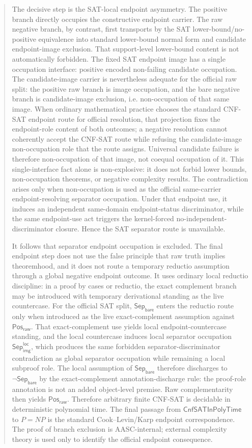 \documentclass[11pt]{article}
\theoremstyle{definition}
\theoremstyle{remark}
\newcommand{\PosRaw}{\mathsf{Pos}_{\mathsf{raw}}}
\newcommand{\SepBare}{\mathsf{Sep}_{\mathsf{bare}}}
\newcommand{\LocalSepImgOcc}{\mathsf{Sep}_{\mathsf{img}}^{\mathsf{loc}}}
\newcommand{\CnfSATP}{\mathsf{CnfSATInPolyTime}}
\begin{document}
\begin{abstract}
The decisive step is the SAT-local endpoint asymmetry. The positive branch directly occupies the constructive endpoint carrier. The raw negative branch, by contrast, first transports by the SAT lower-bound/no-positive equivalence into standard lower-bound normal form and candidate endpoint-image exclusion. That support-level lower-bound content is not automatically forbidden. The fixed SAT endpoint image has a single occupation interface: positive encoded non-failing candidate occupation. The candidate-image carrier is nevertheless adequate for the official raw split: the positive raw branch is image occupation, and the bare negative branch is candidate-image exclusion, i.e. non-occupation of that same image. When ordinary mathematical practice chooses the standard CNF-SAT endpoint route for official resolution, that projection fixes the endpoint-role content of both outcomes; a negative resolution cannot coherently accept the CNF-SAT route while refusing the candidate-image non-occupation role that the route assigns. Universal candidate failure is therefore non-occupation of that image, not coequal occupation of it. This single-interface fact alone is non-explosive: it does not forbid lower bounds, non-occupation theorems, or negative complexity results. The contradiction arises only when non-occupation is used as the official same-carrier endpoint-resolving separator occupation. Under that endpoint use, it induces an independent same-domain endpoint-status discriminator, while the same endpoint-use act triggers the kernel-forced no-independent-discriminator closure. Hence the SAT separator route is unavailable.

It follows that separator endpoint occupation is excluded. The final endpoint step does not use the false principle that raw truth implies theoremhood, and it does not route a temporary reductio assumption through a global negative endpoint outcome. It uses ordinary local reductio discipline: in a proof by cases or reductio, the exact complement branch may be introduced with temporary derivational standing as the live countercase. For the official SAT split, \(\SepBare\) enters the reductio route only when introduced as the live exact-complement assumption against \(\PosRaw\). That exact-complement use yields local endpoint-countercase standing, and the local countercase induces local separator occupation \(\LocalSepImgOcc\), which produces the same forbidden separator-discriminator contradiction as global separator occupation while remaining a local subproof role. The local assumption of \(\SepBare\) therefore discharges to \(\neg\SepBare\) by the exact-complement annotation-discharge rule: the proof-role annotation is not an added object-level premise. Raw complementarity then yields \(\PosRaw\). Therefore arbitrary finite CNF-SAT is decidable in deterministic polynomial time. The final passage from \(\CnfSATP\) to \(P=NP\) is the standard Cook--Levin/Karp endpoint correspondence. The proof of branch exclusion is AASC-internal; external complexity theory is used only to identify the official endpoint consequence.
\end{abstract}
\end{document}
